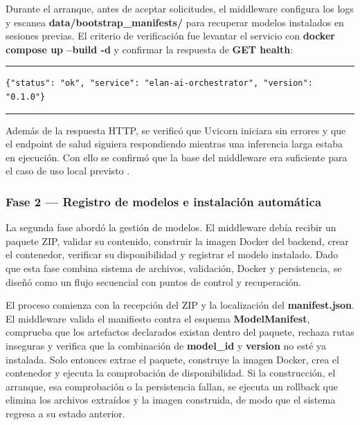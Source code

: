 Durante el arranque, antes de aceptar solicitudes, el middleware configura los logs y escanea \textbf{data/bootstrap\_manifests/} para recuperar modelos instalados en sesiones previas. El criterio de verificación fue levantar el servicio con \textbf{docker compose up --build -d} y confirmar la respuesta de \textbf{GET health}:

\begin{center}
\begin{minipage}{0.95\textwidth}
\hrule
\vspace{0.12cm}
\small
\begin{Verbatim}[baselinestretch=0.82]
{"status": "ok", "service": "elan-ai-orchestrator", "version": "0.1.0"}
\end{Verbatim}
\vspace{0.05cm}
\hrule

\label{lst:health_response}
\end{minipage}
\end{center}

Además de la respuesta HTTP, se verificó que Uvicorn iniciara sin errores y que el endpoint de salud siguiera respondiendo mientras una inferencia larga estaba en ejecución. Con ello se confirmó que la base del middleware era suficiente para el caso de uso local previsto \cite{uvicorn_docs}.

\subsubsection{Fase 2 — Registro de modelos e instalación automática}

La segunda fase abordó la gestión de modelos. El middleware debía recibir un paquete ZIP, validar su contenido, construir la imagen Docker del backend, crear el contenedor, verificar su disponibilidad y registrar el modelo instalado. Dado que esta fase combina sistema de archivos, validación, Docker y persistencia, se diseñó como un flujo secuencial con puntos de control y recuperación.

El proceso comienza con la recepción del ZIP y la localización del \textbf{manifest.json}. El middleware valida el manifiesto contra el esquema \textbf{ModelManifest}, comprueba que los artefactos declarados existan dentro del paquete, rechaza rutas inseguras y verifica que la combinación de \textbf{model\_id} y \textbf{version} no esté ya instalada. Solo entonces extrae el paquete, construye la imagen Docker, crea el contenedor y ejecuta la comprobación de disponibilidad. Si la construcción, el arranque, esa comprobación o la persistencia fallan, se ejecuta un rollback que elimina los archivos extraídos y la imagen construida, de modo que el sistema regresa a su estado anterior.

